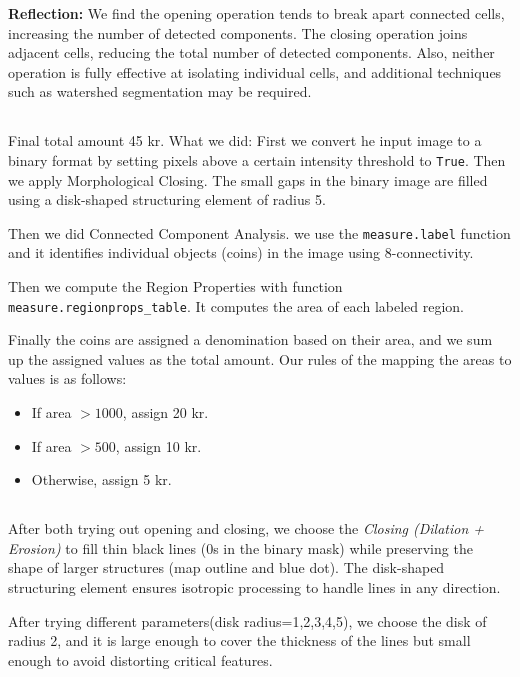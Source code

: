 \documentclass[12pt]{article}
\begin{document}
\textbf{Reflection: }We find the opening operation tends to break apart connected cells, increasing the number of detected components. The closing operation joins adjacent cells, reducing the total number of detected components. Also, neither operation is fully effective at isolating individual cells, and additional techniques such as watershed segmentation may be required.

\subsection{} %

Final total amount 45 kr. What we did: First we convert he input image to a binary format by setting pixels above a certain intensity threshold to \texttt{True}. 
Then we apply Morphological Closing. The small gaps in the binary image are filled using a disk-shaped structuring element of radius 5.

Then we did Connected Component Analysis. we use the \texttt{measure.label} function and it identifies individual objects (coins) in the image using 8-connectivity.

Then we compute the Region Properties with function \texttt{measure.regionprops\_table}. It computes the area of each labeled region.

Finally the coins are assigned a denomination based on their area, and we sum up the assigned values as the total amount. Our rules of the mapping the areas to values is as follows:
    \begin{itemize}
        \item If area $> 1000$, assign 20 kr.
        \item If area $> 500$, assign 10 kr.
        \item Otherwise, assign 5 kr.
    \end{itemize}

\subsection{} %

After both trying out opening and closing, we choose the \textit{Closing (Dilation + Erosion)} to fill thin black lines (0s in the binary mask) while preserving the shape of larger structures (map outline and blue dot). The disk-shaped structuring element ensures isotropic processing to handle lines in any direction.

After trying different parameters(disk radius=1,2,3,4,5), we choose the disk of radius 2, and it is large enough to cover the thickness of the lines but small enough to avoid distorting critical features.
\end{document}
